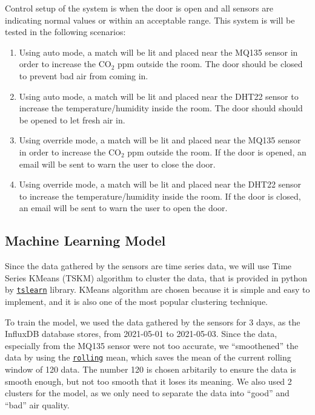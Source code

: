 Control setup of the system is when the door is open and all sensors are
indicating normal values or within an acceptable range. This system is will be
tested in the following scenarios:
\begin{enumerate}
    \item Using auto mode, a match will be lit and placed near the MQ135 sensor
          in order to increase the CO$_2$ ppm outside the room. The door should
          be closed to prevent bad air from coming in.
    \item Using auto mode, a match will be lit and placed near the DHT22 sensor
          to increase the temperature/humidity inside the room. The door should
          should be opened to let fresh air in.
    \item Using override mode, a match will be lit and placed near the MQ135
          sensor in order to increase the CO$_2$ ppm outside the room. If the door
          is opened, an email will be sent to warn the user to close the door.
    \item Using override mode, a match will be lit and placed near the DHT22
          sensor to increase the temperature/humidity inside the room. If the door
          is closed, an email will be sent to warn the user to open the door.
\end{enumerate}

\subsection{Machine Learning Model}
Since the data gathered by the sensors are time
series data, we will use Time Series KMeans (TSKM)
algorithm to cluster the data, that is provided in
python by
\href{https://tslearn.readthedocs.io/en/stable/}{\texttt{tslearn}} library.
KMeans algorithm are chosen because it is simple and
easy to implement, and it is also one of the most
popular clustering technique.

To train the model, we used the data gathered by the
sensors for 3 days, as the InfluxDB database stores,
from 2021-05-01 to 2021-05-03. Since the data,
especially from the MQ135 sensor were not too
accurate, we ``smoothened'' the data by using the
\href{https://pandas.pydata.org/docs/reference/api/pandas.DataFrame.rolling.html}{\texttt{rolling}} mean, which saves
the mean of the current rolling window of 120 data. The number
120 is chosen arbitarily to ensure the data is smooth enough,
but not too smooth that it loses its meaning. We also used 2
clusters for the model, as we only need to separate the data
into ``good'' and ``bad'' air quality.

